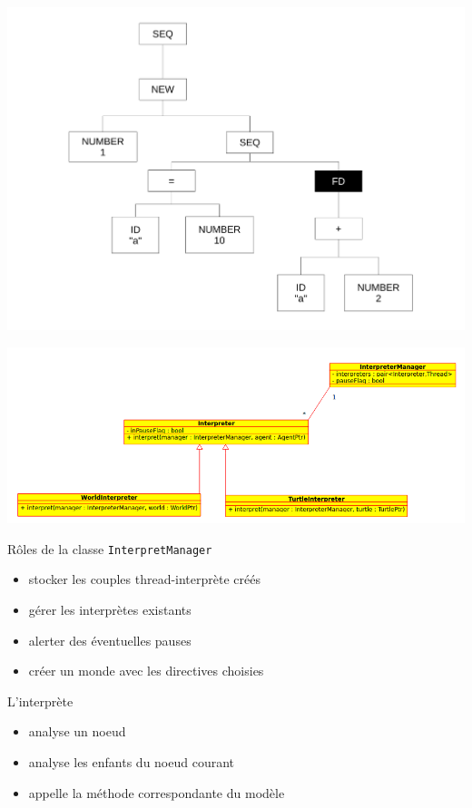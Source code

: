 \begin{frame}
\includegraphics[scale=0.3]{doc/Presentation/img/arbre8.pdf}
\end{frame}

\begin{frame}
\includegraphics[scale=0.3]{doc/report/uml/interpreterUML.png}
\end{frame}

\begin{frame}[fragile]
Rôles de la classe \verb|InterpretManager|
\begin{itemize}
	\item stocker les couples thread-interprète créés
	\item gérer les interprètes existants
	\item alerter des éventuelles pauses
	\item créer un monde avec les directives choisies
\end{itemize}
\end{frame}

\begin{frame}

L'interprète
\begin{itemize}
	\item analyse un noeud
	\item analyse les enfants du noeud courant
	\item appelle la méthode correspondante du modèle
\end{itemize}
\end{frame}
